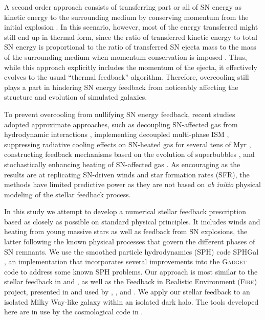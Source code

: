 \documentclass[iop]{emulateapj}
\begin{document}
A second order approach consists of transferring part or all of SN energy as kinetic energy to the surrounding medium by conserving momentum from the initial explosion \citep[see e.g.,][]{Dubois08b}. In this scenario, however, most of the energy transferred might still end up in thermal form, since the ratio of transferred kinetic energy to total SN energy is proportional to the ratio of transferred SN ejecta mass to the mass of the surrounding medium when momentum conservation is imposed \citep[see e.g.,][]{Hu14, Kimm2015}. Thus, while this approach explicitly includes the momentum of the ejecta, it effectively evolves to the usual ``thermal feedback'' algorithm. Therefore, overcooling still plays a part in hindering SN energy feedback from noticeably affecting the structure and evolution of simulated galaxies.

To prevent overcooling from nullifying SN energy feedback, recent studies adopted approximate approaches, such as decoupling SN-affected gas from hydrodynamic interactions \citep[e.g.,][]{Springel05a, Oppenheimer08, Vogelsberger13, Vogelsberger14}, implementing decoupled multi-phase ISM \citep{Scannapieco06, Aumer13}, suppressing radiative cooling effects on SN-heated gas for several tens of Myr \citep{Stinson06, Guedes2011}, constructing feedback mechanisms based on the evolution of superbubbles \citep{Keller2014, Keller2015}, and stochastically enhancing heating of SN-affected gas \citep{Dalla12, Schaye15}. As encouraging as the results are at replicating SN-driven winds and star formation rates (SFR), the methods have limited predictive power as they are not based on \emph{ab initio} physical modeling of the stellar feedback process.

In this study we attempt to develop a numerical stellar feedback prescription based as closely as possible on standard physical principles. It includes winds and heating from young massive stars as well as feedback from SN explosions, the latter following the known physical processes that govern the different phases of SN remnants. We use the smoothed particle hydrodynamics (SPH) code SPHGal \citep{Hu14}, an implementation that incorporates several improvements into the \textsc{Gadget} code \citep{Springel05b} to address some known SPH problems. Our approach is most similar to the stellar feedback in \citet{Agertz13} and \citet{Agertz2016}, as well as the Feedback in Realistic Environment (\textsc{Fire}) project, presented in \citet{Hopkins14} and used by \citet{Hopkins12, Hopkins2013b}, \citet{Muratov15}, and \citet{Su2016}. We apply our stellar feedback to an isolated Milky Way-like galaxy within an isolated dark halo. The tools developed here are in use by the cosmological code in \citet{Choi2016}.
\end{document}
